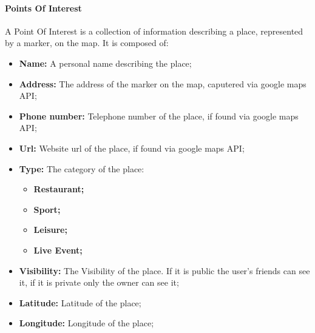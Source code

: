 \documentclass[../../main]{subfiles}
\begin{document}
    \paragraph*{Points Of Interest}
A Point Of Interest is a collection of information describing a place, represented by a marker, on the map. 
It is composed of:
\begin{itemize}
    \item \textbf{Name:} A personal name describing the place;
    \item \textbf{Address:} The address of the marker on the map, caputered via google maps API;
    \item \textbf{Phone number:} Telephone number of the place, if found via google maps API;
    \item \textbf{Url:} Website url of the place, if found via google maps API;
    \item \textbf{Type:} The category of the place:
        \begin{itemize}
            \item \textbf{Restaurant;}
            \item \textbf{Sport;}
            \item \textbf{Leisure;}
            \item \textbf{Live Event;} 
        \end{itemize}
    \item \textbf{Visibility:} The Visibility of the place. If it is public the user's friends can see it, if it is private only the owner can see it;
    \item \textbf{Latitude:} Latitude of the place;
    \item \textbf{Longitude:} Longitude of the place;
\end{itemize}
    
\end{document}
